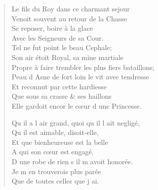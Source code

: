 \documentclass[14pt,a4paper]{memoir}
\begin{document}
{{\begin{otherlanguage}{french}
\begin{verse}
\vin Le fils du Roy dans ce charmant sejour \\
\vin Venoit souvent au retour de la Chasse \\
\vin Se reposer, boire à la glace \\
\vin Avec les Seigneurs de sa Cour. \\
\vin Tel ne fut point le beau Cephale; \\
Son air étoit Royal, sa mine martiale \\
Propre à faire trembler les plus fiers bataillons; \\
Peau d\textquotesingle{} Asne de fort loin le vit avec tendresse \\
\vin Et reconnut par cette hardiesse \\
\vin Que sous sa crasse \& ses haillons \\
Elle gardoit encor le cœur d\textquotesingle{} une Princesse.

\vin Qu\textquotesingle{} il a l\textquotesingle{} air grand, quoi qu\textquotesingle{} il l\textquotesingle{} ait negligé, \\
\vin Qu\textquotesingle{} il est aimable, disoit-elle, \\
\vin Et que bienheureuse est la belle \\
\vin A qui son cœur est engagé. \\
D\textquotesingle{} une robe de rien s\textquotesingle{} il m\textquotesingle{} avoit honorée. \\
\vin Je m\textquotesingle{} en trouverois plus parée \\
\vin Que de toutes celles que j\textquotesingle{} ai.


\end{verse}
\end{otherlanguage}}}
\end{document}
